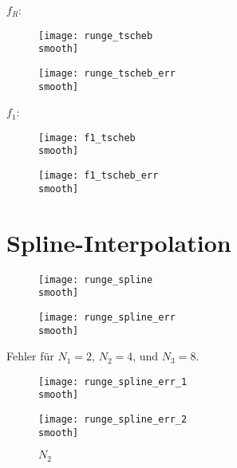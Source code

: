 \documentclass[]{scrartcl}
\begin{document}
	$f_R$:
	
	\begin{figure}[h]
		\centering
		\begin{minipage}{0.5\textwidth}
			\texttt{[image: runge\_tscheb\\smooth]}
			\caption{\label{Abb.3}}
		\end{minipage}
		\begin{minipage}{0.49\textwidth}
			\texttt{[image: runge\_tscheb\_err\\smooth]}
			\caption{\label{Abb.4}}
		\end{minipage}
	\end{figure}
	\lipsum*[100]
	
	$f_1$:
	
	\begin{figure}[h]
		\centering
		\begin{minipage}{0.5\textwidth}
			\texttt{[image: f1\_tscheb\\smooth]}
			\caption{}
		\end{minipage}
		\begin{minipage}{0.49\textwidth}
			\texttt{[image: f1\_tscheb\_err\\smooth]}
			\caption{}
		\end{minipage}
	\end{figure}
	
	\lipsum[10]
	\section{Spline-Interpolation}
	\begin{figure}[h]
		\centering
		\begin{minipage}{0.5\textwidth}
			\texttt{[image: runge\_spline\\smooth]}
			\caption{\label{Abb.5}}
		\end{minipage}
		\begin{minipage}{0.49\textwidth}
			\texttt{[image: runge\_spline\_err\\smooth]}
			\caption{\label{Abb.6}}
		\end{minipage}
	\end{figure}
	
	Fehler für $N_1=2$, $N_2=4$, und $N_3=8$.
	\begin{figure}[h]
 		\centering
 		\begin{minipage}{0.5\textwidth}
 			\texttt{[image: runge\_spline\_err\_1\\smooth]}
 			\caption{$N_1$\label{Abb.7}}
 		\end{minipage}
 		\begin{minipage}{0.49\textwidth}
 			\texttt{[image: runge\_spline\_err\_2\\smooth]}
 			\caption{$N_2$\label{Abb.8}}
 		\end{minipage}
 	\end{figure}
 	
\end{document}
